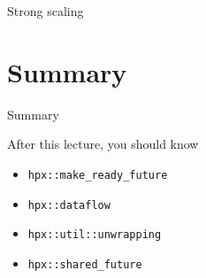 \documentclass[12pt,t]{beamer}
\begin{document}
\begin{frame}{Strong scaling}

\end{frame}





\section{Summary}
\begin{frame}{Summary}
\begin{block}{After this lecture, you should know}
\begin{itemize}
\item \lstinline|hpx::make_ready_future|
\item \lstinline|hpx::dataflow|
\item \lstinline|hpx::util::unwrapping|
\item \lstinline|hpx::shared_future|
\end{itemize}
\end{block}
\end{frame}
\end{document}
